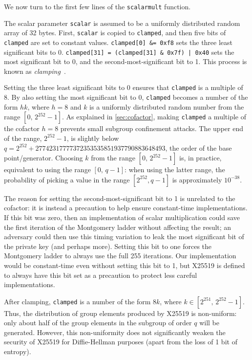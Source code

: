 \documentclass[manuscript]{acmart}
\begin{document}
We now turn to the first few lines of the \verb|scalarmult| function.

The scalar parameter \verb|scalar| is assumed to be a uniformly distributed random array of 32 bytes.
First, \verb|scalar| is copied to \verb|clamped|, and then five bits of \verb|clamped| are set to constant values.
\verb+clamped[0] &= 0xf8+ sets the three least significant bits to 0.
\verb+clamped[31] = (clamped[31] & 0x7f) | 0x40+ sets the most significant bit to 0, and the second-most-significant bit to 1.
This process is known as \emph{clamping}~\cite{Madden:2020}.

Setting the three least significant bits to 0 ensures that \verb|clamped| is a multiple of 8.
By also setting the most significant bit to 0, \verb|clamped| becomes a number of the form $hk$, where $h=8$ and $k$ is a uniformly distributed random number from the range $[0,\, 2^{252}-1]$.
As explained in \autoref{sec:cofactor}, making \verb|clamped| a multiple of the cofactor $h=8$ prevents small subgroup confinement attacks.
The upper end of the range, $2^{252}-1$, is slightly below $q = 2^{252} + 27742317777372353535851937790883648493$, the order of the base point/generator.
Choosing $k$ from the range $[0,\, 2^{252}-1]$ is, in practice, equivalent to using the range $[0,\, q-1]$: when using the latter range, the probability of picking a value in the range $[2^{252}, q-1]$ is approximately $10^{-38}$.

The reason for setting the second-most-significant bit to 1 is unrelated to the cofactor: it is instead a precaution to help ensure constant-time implementations.
If this bit was zero, then an implementation of scalar multiplication could save the first iteration of the Montgomery ladder without affecting the result; an adversary could then use this timing variation to leak the most significant bit of the private key (and perhaps more).
Setting this bit to one forces the Montgomery ladder to always use the full 255 iterations.
Our implementation would be constant-time even without setting this bit to 1, but X25519 is defined to always have this bit set as a precaution to protect less careful implementations.

After clamping, \verb|clamped| is a number of the form $8k$, where $k \in [2^{251},\, 2^{252}-1]$.
Thus, the distribution of group elements produced by X25519 is non-uniform: only about half of the group elements in the subgroup of order $q$ will be generated.
However, this non-uniformity does not significantly weaken the security of X25519 for Diffie-Hellman purposes (apart from the loss of 1 bit of entropy).
\end{document}
